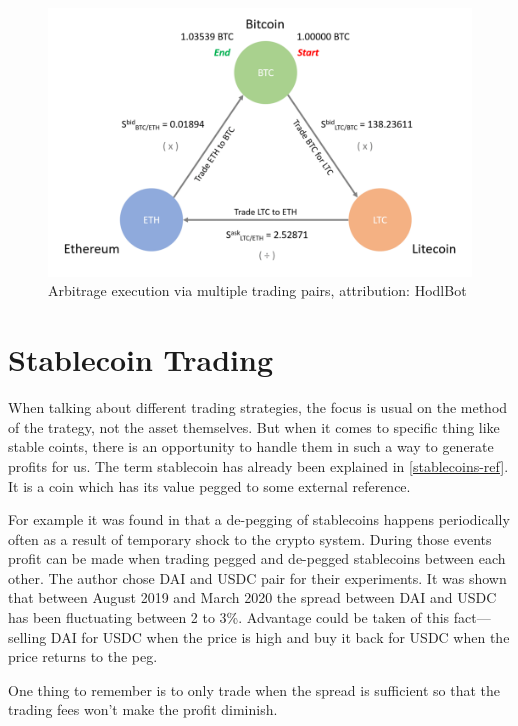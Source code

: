 \begin{figure}[h!]
    \label{arbitrage-figure}
    \centering
    \includegraphics[width=\columnwidth]{figures/arbitrage.png}
    \caption{Arbitrage execution via multiple trading pairs, attribution: HodlBot}
\end{figure}

\section{Stablecoin Trading}

When talking about different trading strategies, the focus is usual on the method of the trategy, not the asset themselves. But when it comes to specific thing like stable coints, there is an opportunity to handle them in such a way to generate profits for us.
The term stablecoin has already been explained in \ref{stablecoins-ref}. It is a coin which has its value pegged to some external reference.

For example it was found in \cite{make-money-stablecoins} that a de-pegging of stablecoins happens periodically often as a result of temporary shock to the crypto system. During those events profit can be made when trading pegged and de-pegged stablecoins between each other. The author chose DAI and USDC pair for their experiments. It was shown that between August 2019 and March 2020 the spread between DAI and USDC has been fluctuating between 2 to 3\%. Advantage could be taken of this fact---selling DAI for USDC when the price is high and buy it back for USDC when the price returns to the peg.

One thing to remember is to only trade when the spread is sufficient so that the trading fees won't make the profit diminish.

